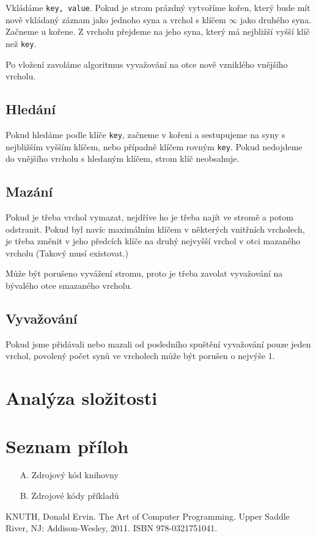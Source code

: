 \documentclass[a4paper,11pt,openany]{article}
\begin{document}
Vkládáme \texttt{key, value}.  Pokud  je  strom  prázdný  vytvoříme  kořen,  který  bude  mít  nově  vkládaný záznam jako jednoho syna a vrchol s klíčem $\infty$ jako druhého syna. Začneme u kořene. Z vrcholu přejdeme na jeho syna, který má nejbližší vyšší klíč než \texttt{key}.

Po vložení zavoláme algoritmus vyvažování na otce nově vzniklého vnějšího vrcholu.
	
\subsection{Hledání}

Pokud hledáme podle klíče \texttt{key}, začneme v kořeni a sestupujeme na syny s nejbližším vyšším klíčem, nebo případně klíčem rovným \texttt{key}. Pokud nedojdeme do vnějšího vrcholu s hledaným klíčem, strom klíč neobsahuje.

\subsection{Mazání}

Pokud je třeba vrchol vymazat, nejdříve ho je třeba najít ve stromě a potom odstranit. Pokud byl navíc maximálním klíčem v některých vnitřních vrcholech, je třeba změnit v jeho předcích klíče na druhý nejvyšší vrchol v otci mazaného vrcholu (Takový musí existovat.)

Může být porušeno vyvážení stromu, proto je třeba zavolat vyvažování na bývalého otce smazaného vrcholu.
	
\subsection{Vyvažování}

Pokud jsme přidávali nebo mazali od posledního spuštění vyvažování pouze jeden vrchol, povolený počet synů ve vrcholech může být porušen o nejvýše 1.


	
\section{Analýza složitosti}
	
\lipsum[10]
	
\lipsum[10]
	
\listoffigures
\listoftables
\section*{Seznam příloh}
\begin{enumerate}
	\item[A.] Zdrojový kód knihovny
	\item[B.] Zdrojové kódy příkladů
\end{enumerate}
\begin{thebibliography}{10}
	KNUTH, Donald Ervin. The Art of Computer Programming. Upper Saddle River, NJ: Addison-Wesley, 2011. ISBN 978-0321751041.
\end{thebibliography}
\end{document}
